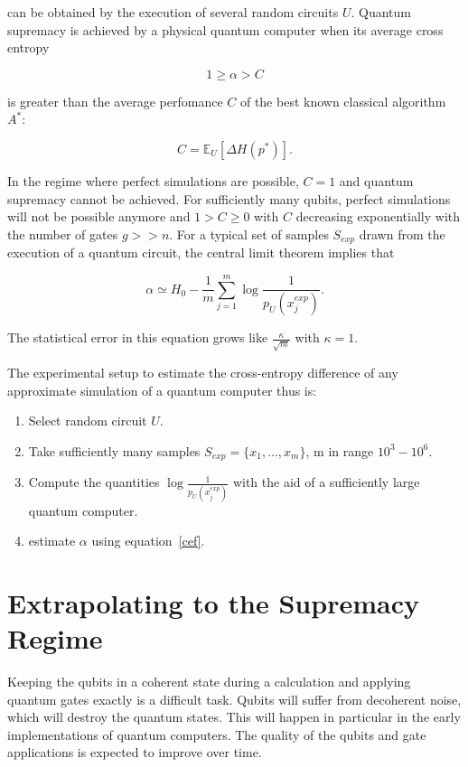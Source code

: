 can be obtained by the execution of several random circuits $U$. Quantum
supremacy is achieved by a physical quantum computer when its average cross
entropy

\begin{equation}
  1 \geq \alpha > C
\end{equation}

is greater than the average perfomance $C$ of the best known classical algorithm $A^*$:

\begin{equation}
  C = \mathbb{E}_U[\Delta H(p^*)] .
\end{equation}

In the regime where perfect simulations are possible, $C=1$ and quantum
supremacy cannot be achieved. For sufficiently many qubits, perfect simulations
will not be possible anymore and $1 > C \geq 0$ with $C$ decreasing exponentially
with the number of gates $g>>n$. For a typical set of samples $S_{exp}$ drawn from the
execution of a quantum circuit, the central limit theorem implies that

\begin{equation}
  \label{eq:cef}
  \alpha \simeq H_0 - \frac{1}{m} \sum_{j = 1}^m \log{\frac{1}{p_U(x_j^{exp})}}.
\end{equation}

The statistical error in this equation grows like
$\frac{\kappa}{\sqrt{m}}$ with $\kappa=1$.

The experimental setup to estimate the cross-entropy difference of any
approximate simulation of a quantum computer thus is:

\begin{enumerate}
\item Select random circuit $U$.
  \item Take sufficiently many samples $S_{exp} = \{x_1, \dots, x_m\}$, m in
    range $10^3-10^6$.
    \item Compute the quantities $\log{\frac{1}{p_U(x_j^{exp})}}$ with the aid
      of a sufficiently large quantum computer.
      \item estimate $\alpha$ using equation~\ref{cef}.
\end{enumerate}

\section{Extrapolating to the Supremacy Regime}

Keeping the qubits in a coherent state during a calculation and applying quantum
gates exactly is a difficult task. Qubits will suffer from decoherent noise, which will destroy the quantum states. This will happen in particular in the early implementations of quantum computers. The quality of the
qubits and gate applications is expected to improve over time.


